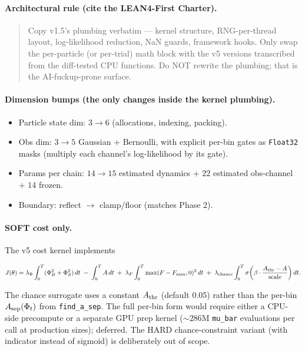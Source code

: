 \documentclass[11pt,a4paper]{article}
\begin{document}
\paragraph{Architectural rule (cite the LEAN4-First Charter).}

\begin{quote}
Copy v1.5's plumbing verbatim --- kernel structure, RNG-per-thread
layout, log-likelihood reduction, NaN guards, framework hooks. Only
swap the per-particle (or per-trial) math block with the v5
versions transcribed from the diff-tested CPU functions. Do NOT
rewrite the plumbing; that is the AI-fuckup-prone surface.
\end{quote}

\paragraph{Dimension bumps (the only changes inside the kernel
plumbing).}

\begin{itemize}[itemsep=2pt]
  \item Particle state dim: $3 \to 6$ (allocations, indexing, packing).
  \item Obs dim: $3 \to 5$ Gaussian + Bernoulli, with explicit
        per-bin gates as \texttt{Float32} masks (multiply each
        channel's log-likelihood by its gate).
  \item Params per chain: $14 \to 15$ estimated dynamics +
        $22$ estimated obs-channel + $14$ frozen.
  \item Boundary: reflect $\to$ clamp/floor (matches Phase 2).
\end{itemize}

\paragraph{SOFT cost only.} The v5 cost kernel implements

\[
J(\theta) = \lambda_\Phi \int_0^T (\Phi_B^2 + \Phi_S^2) \, dt
            \;-\; \int_0^T A \, dt
            \;+\; \lambda_F \int_0^T \max(F - F_{\max}, 0)^2 \, dt
            \;+\; \lambda_{\rm chance} \int_0^T \sigma\!\left(
              \beta \cdot \frac{A_{\rm thr} - A}{\rm scale}
            \right) dt.
\]

The chance surrogate uses a constant $A_{\rm thr}$ (default 0.05)
rather than the per-bin $A_{\rm sep}(\Phi_t)$ from
\texttt{find\_a\_sep}. The full per-bin form would require either
a CPU-side precompute or a separate GPU prep kernel
(${\sim} 286$M \texttt{mu\_bar} evaluations per call at production
sizes); deferred. The HARD chance-constraint variant (with
indicator instead of sigmoid) is deliberately out of scope.
\end{document}
